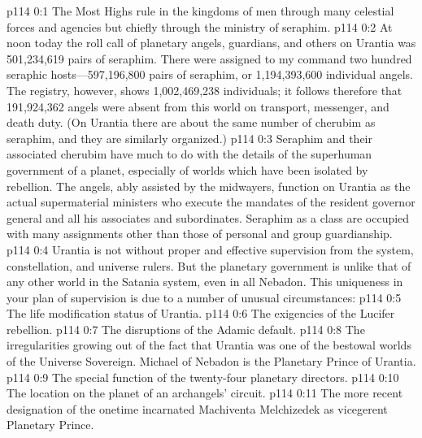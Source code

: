 \author{Chief of Seraphim}
\vs p114 0:1 The Most Highs rule in the kingdoms of men through many celestial forces and agencies but chiefly through the ministry of seraphim.
\vs p114 0:2 At noon today the roll call of planetary angels, guardians, and others on Urantia was 501,234,619 pairs of seraphim. There were assigned to my command two hundred seraphic hosts---597,196,800 pairs of seraphim, or 1,194,393,600 individual angels. The registry, however, shows 1,002,469,238 individuals; it follows therefore that 191,924,362 angels were absent from this world on transport, messenger, and death duty. (On Urantia there are about the same number of cherubim as seraphim, and they are similarly organized.)\plusone
\vs p114 0:3 Seraphim and their associated cherubim have much to do with the details of the superhuman government of a planet, especially of worlds which have been isolated by rebellion. The angels, ably assisted by the midwayers, function on Urantia as the actual supermaterial ministers who execute the mandates of the resident governor general and all his associates and subordinates. Seraphim as a class are occupied with many assignments other than those of personal and group guardianship.
\vs p114 0:4 Urantia is not without proper and effective supervision from the system, constellation, and universe rulers. But the planetary government is unlike that of any other world in the Satania system, even in all Nebadon. This uniqueness in your plan of supervision is due to a number of unusual circumstances:
\pc \vs p114 0:5 \bibnobreakspace The life modification status of Urantia.
\vs p114 0:6 \bibnobreakspace The exigencies of the Lucifer rebellion.
\vs p114 0:7 \bibnobreakspace The disruptions of the Adamic default.
\vs p114 0:8 \bibnobreakspace The irregularities growing out of the fact that Urantia was one of the bestowal worlds of the Universe Sovereign. Michael of Nebadon is the Planetary Prince of Urantia.
\vs p114 0:9 \bibnobreakspace The special function of the twenty\hyp{}four planetary directors.
\vs p114 0:10 \bibnobreakspace The location on the planet of an archangels’ circuit.
\vs p114 0:11 \bibnobreakspace The more recent designation of the onetime incarnated Machiventa Melchizedek as vicegerent Planetary Prince.
